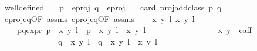 \begin{isabellebody}
\isanewline
{}\isamarkupfalse%
\ well{\isacharunderscore}defined{\isacharcolon}\isanewline
\ \ \ {\isachardoublequoteopen}p\ {\isasymin}\ e{\isacharunderscore}proj{\isachardoublequoteclose}\ {\isachardoublequoteopen}q\ {\isasymin}\ e{\isacharunderscore}proj{\isachardoublequoteclose}\isanewline
\ \ \ {\isachardoublequoteopen}card\ {\isacharparenleft}proj{\isacharunderscore}add{\isacharunderscore}class\ p\ q{\isacharparenright}\ {\isacharequal}\ {}{\isachardoublequoteclose}\isanewline
%
\isadelimproof
%
\endisadelimproof
%
\isatagproof
{}\isamarkupfalse%
\ {\isacharminus}\isanewline
\ \ \isamarkupfalse%
\ e{\isacharunderscore}proj{\isacharunderscore}eq{\isacharbrackleft}OF\ assms{\isacharparenleft}{}{\isacharparenright}{\isacharbrackright}\ e{\isacharunderscore}proj{\isacharunderscore}eq{\isacharbrackleft}OF\ assms{\isacharparenleft}{}{\isacharparenright}{\isacharbrackright}\isanewline
\ \ \isamarkupfalse%
\ x\ y\ l\ x{\isacharprime}\ y{\isacharprime}\ l{\isacharprime}\ \ \isanewline
\ \ \ \ p{\isacharunderscore}q{\isacharunderscore}expr{\isacharcolon}\ {\isachardoublequoteopen}{\isacharparenleft}p\ {\isacharequal}\ {\isacharbraceleft}{\isacharparenleft}{\isacharparenleft}x{\isacharcomma}\ y{\isacharparenright}{\isacharcomma}\ l{\isacharparenright}{\isacharbraceright}\ {\isasymor}\ p\ {\isacharequal}\ {\isacharbraceleft}{\isacharparenleft}{\isacharparenleft}x{\isacharcomma}\ y{\isacharparenright}{\isacharcomma}\ l{\isacharparenright}{\isacharcomma}\ {\isacharparenleft}{\isasymtau}\ {\isacharparenleft}x{\isacharcomma}\ y{\isacharparenright}{\isacharcomma}\ l\ {\isacharplus}\ {}{\isacharparenright}{\isacharbraceright}{\isacharparenright}{\isachardoublequoteclose}\ \isanewline
\ \ \ \ \ \ \ \ \ \ \ \ \ \ {\isachardoublequoteopen}{\isacharparenleft}x{\isacharcomma}\ y{\isacharparenright}\ {\isasymin}\ e{\isacharunderscore}aff{\isachardoublequoteclose}\ \isanewline
\ \ \ \ \ \ \ \ \ \ \ \ \ \ {\isachardoublequoteopen}{\isacharparenleft}q\ {\isacharequal}\ {\isacharbraceleft}{\isacharparenleft}{\isacharparenleft}x{\isacharprime}{\isacharcomma}\ y{\isacharprime}{\isacharparenright}{\isacharcomma}\ l{\isacharprime}{\isacharparenright}{\isacharbraceright}\ {\isasymor}\ q\ {\isacharequal}\ {\isacharbraceleft}{\isacharparenleft}{\isacharparenleft}x{\isacharprime}{\isacharcomma}\ y{\isacharprime}{\isacharparenright}{\isacharcomma}\ l{\isacharprime}{\isacharparenright}{\isacharcomma}\ {\isacharparenleft}{\isasymtau}\ {\isacharparenleft}x{\isacharprime}{\isacharcomma}\ y{\isacharprime}{\isacharparenright}{\isacharcomma}\ l{\isacharprime}\ {\isacharplus}\ {}{\isacharparenright}{\isacharbraceright}{\isacharparenright}{\isachardoublequoteclose}\isanewline

\end{isabellebody}
